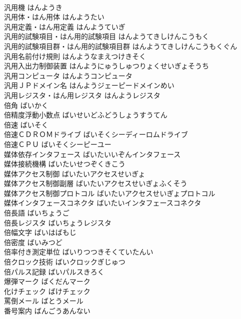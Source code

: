 \documentclass[8pt]{extreport}
\begin{document}
\begin{CJK}{UTF8}{min}
\\	汎用機	はんようき	
\\	汎用体・はん用体	はんようたい	
\\	汎用定義・はん用定義	はんようていぎ	
\\	汎用的試験項目・はん用的試験項目	はんようてきしけんこうもく	
\\	汎用的試験項目群・はん用的試験項目群	はんようてきしけんこうもくぐん	
\\	汎用名前付け規則	はんようなまえつけきそく	
\\	汎用入出力制御装置	はんようにゅうしゅつりょくせいぎょそうち	
\\	汎用コンピュータ	はんようコンピュータ	
\\	汎用ＪＰドメイン名	はんようジェーピードメインめい	
\\	汎用レジスタ・はん用レジスタ	はんようレジスタ	
\\	倍角	ばいかく	
\\	倍精度浮動小数点	ばいせいどふどうしょうすうてん	
\\	倍速	ばいそく	
\\	倍速ＣＤＲＯＭドライブ	ばいそくシーディーロムドライブ	
\\	倍速ＣＰＵ	ばいそくシーピーユー	
\\	媒体依存インタフェース	ばいたいいぞんインタフェース	
\\	媒体接続機構	ばいたいせつぞくきこう	
\\	媒体アクセス制御	ばいたいアクセスせいぎょ	
\\	媒体アクセス制御副層	ばいたいアクセスせいぎょふくそう	
\\	媒体アクセス制御プロトコル	ばいたいアクセスせいぎょプロトコル	
\\	媒体インタフェースコネクタ	ばいたいインタフェースコネクタ	
\\	倍長語	ばいちょうご	
\\	倍長レジスタ	ばいちょうレジスタ	
\\	倍幅文字	ばいはばもじ	
\\	倍密度	ばいみつど	
\\	倍率付き測定単位	ばいりつつきそくていたんい	
\\	倍クロック技術	ばいクロックぎじゅつ	
\\	倍パルス記録	ばいパルスきろく	
\\	爆弾マーク	ばくだんマーク	
\\	化けチェック	ばけチェック	
\\	罵倒メール	ばとうメール	
\\	番号案内	ばんごうあんない	

\end{CJK}
\end{document}
